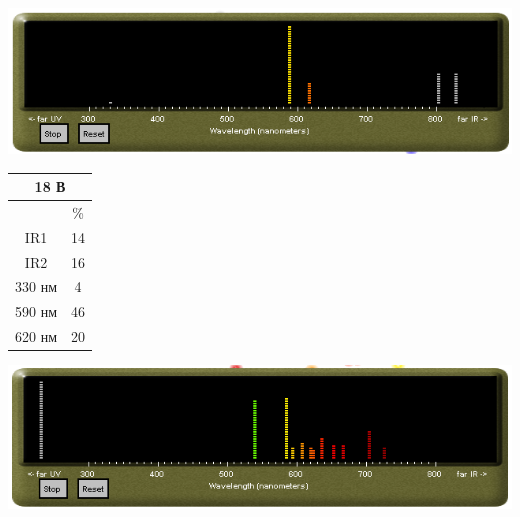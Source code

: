 \documentclass[a4paper,14pt]{extreport}
\begin{document}
\newpage


 
\begin{center}
 

\includegraphics[width=0.7\linewidth]{3.png}\end{center}

		\begin{center}
		\begin{tabular}{|c|c|}
		\hline
		\multicolumn{2}{|c|}{18 В}                              \\ \hline
		                             & \%                       \\ \hline
		IR1                          & 14                     \\ \hline
		IR2                          & 16                      \\ \hline
		330 нм                       & 4                     \\ \hline
		590 нм                       & 46                      \\ \hline
		620 нм                       & 20                     \\ \hline
		\end{tabular}
	\end{center}

 

 






		\begin{center}
		\includegraphics[width=0.7\linewidth]{4.png}\end{center}
\end{document}
